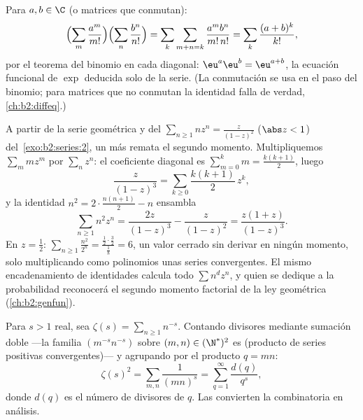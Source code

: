 \begin{example}\label{ex:b2:series:exp}
Para $a, b \in \C$ (o matrices que conmutan):
\[
\Bigl(\sum_m \frac{a^m}{m!}\Bigr)\Bigl(\sum_n
\frac{b^n}{n!}\Bigr)
= \sum_k \sum_{m+n=k} \frac{a^m b^n}{m!\,n!}
= \sum_k \frac{(a + b)^k}{k!},
\]
por el teorema del binomio en cada diagonal: $\eu^a \eu^b =
\eu^{a+b}$, la ecuación funcional de $\exp$ deducida solo de la
serie. (La conmutación se usa en el paso del binomio; para matrices
que no conmutan la identidad falla de verdad,
\cref{ch:b2:diffeq}.)
\end{example}

\begin{example}\label{ex:b2:series:squaresum}
A partir de la serie geométrica y del $\sum_{n \geq 1} nz^n =
\frac{z}{(1-z)^2}$ ($\abs z < 1$) del~\cref{exo:b2:series:2}, un
 más remata el segundo momento. Multipliquemos
$\sum_m mz^m$ por $\sum_n z^n$: el coeficiente diagonal es
$\sum_{m=0}^k m = \frac{k(k+1)}2$, luego
\[
\frac{z}{(1-z)^3} = \sum_{k\geq0}\frac{k(k+1)}{2}\,z^k ,
\]
y la identidad $n^2 = 2\cdot\frac{n(n+1)}2 - n$ ensambla
\[
\sum_{n\geq1} n^2z^n = \frac{2z}{(1-z)^3} - \frac{z}{(1-z)^2}
= \frac{z(1+z)}{(1-z)^3} .
\]
En $z = \frac12$: $\sum_{n\geq1}\frac{n^2}{2^n} =
\frac{\frac12\cdot\frac32}{\frac18} = 6$, un valor cerrado sin
derivar en ningún momento, solo multiplicando como polinomios unas
series  convergentes. El mismo encadenamiento de
identidades calcula todo $\sum n^dz^n$, y quien se dedique a la
probabilidad reconocerá el segundo momento factorial de la ley
geométrica (\cref{ch:b2:genfun}).
\end{example}

\begin{example}\label{ex:b2:series:doublesum}
Para $s > 1$ real, sea $\zeta(s) = \sum_{n\geq1} n^{-s}$. Contando
divisores mediante sumación doble ---la familia $(m^{-s}n^{-s})$
sobre $(m,n) \in (\N^*)^2$ es  (producto de series
positivas convergentes)--- y agrupando por el producto $q = mn$:
\[
\zeta(s)^2 = \sum_{m,n} \frac{1}{(mn)^s}
= \sum_{q=1}^{\infty} \frac{d(q)}{q^s},
\]
donde $d(q)$ es el número de divisores de $q$. Las  convierten la combinatoria en análisis.
\end{example}

